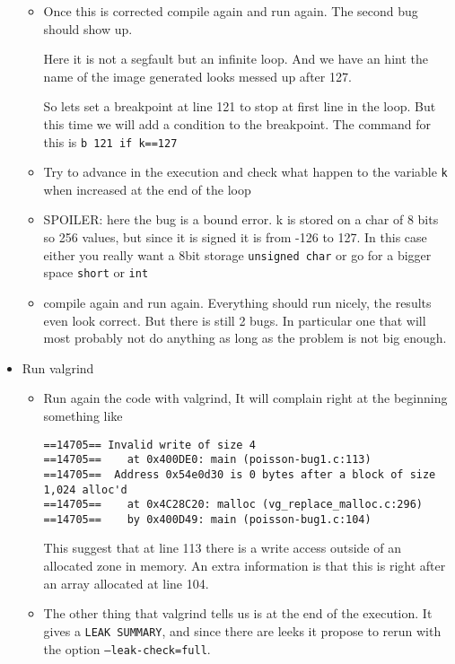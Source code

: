 \documentclass[11pt,a4paper]{article}
\begin{document}
\begin{exercise}[Debugging]
\begin{itemize}
\begin{itemize}
    \item Once this is corrected compile again and run again.
      The second bug should show up.

      Here it is not a segfault but an infinite loop. And we have an hint the
      name of the image generated looks messed up after 127.

      So lets set a breakpoint at line 121 to stop at first line in the
      loop. But this time we will add a condition to the breakpoint. The command
      for this is \texttt{b 121 if k==127}
    \item Try to advance in the execution and check what happen to the variable
      \texttt{k} when increased at the end of the loop

    \item SPOILER: here the bug is a bound error. k is stored on a char of 8
      bits so 256 values, but since it is signed it is from -126 to 127.
      In this case either you really want a 8bit storage \texttt{unsigned char}
      or go for a bigger space \texttt{short} or \texttt{int}

    \item compile again and run again. Everything should run nicely, the results
      even look correct. But there is still 2 bugs. In particular one that will
      most probably not do anything as long as the problem is not big enough.
    \end{itemize}

  \item Run valgrind
    \begin{itemize}
    \item Run again the code with valgrind, It will complain right at the
      beginning something like
\begin{verbatim}
==14705== Invalid write of size 4
==14705==    at 0x400DE0: main (poisson-bug1.c:113)
==14705==  Address 0x54e0d30 is 0 bytes after a block of size 1,024 alloc'd
==14705==    at 0x4C28C20: malloc (vg_replace_malloc.c:296)
==14705==    by 0x400D49: main (poisson-bug1.c:104)
\end{verbatim}

      This suggest that at line 113 there is a write access outside of an
      allocated zone in memory. An extra information is that this is right after
      an array allocated at line 104.

    \item The other thing that valgrind tells us is at the end of the
      execution. It gives a \texttt{LEAK SUMMARY}, and since there are leeks it
      propose to rerun with the option \texttt{--leak-check=full}.


\end{itemize}
\end{itemize}
\end{exercise}
\end{document}
